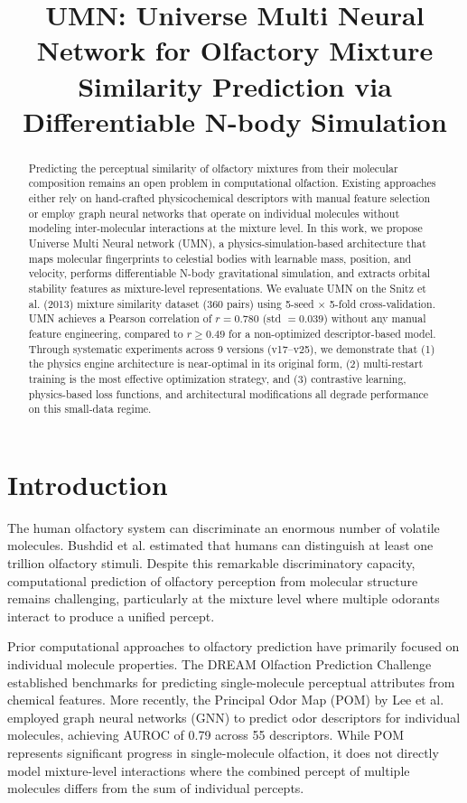 \documentclass[11pt,a4paper]{article}
\title{UMN: Universe Multi Neural Network for Olfactory Mixture Similarity Prediction via Differentiable N-body Simulation}
\author{}
\date{}
\begin{document}
\maketitle

\begin{abstract}
Predicting the perceptual similarity of olfactory mixtures from their molecular composition remains an open problem in computational olfaction. Existing approaches either rely on hand-crafted physicochemical descriptors with manual feature selection or employ graph neural networks that operate on individual molecules without modeling inter-molecular interactions at the mixture level. In this work, we propose Universe Multi Neural network (UMN), a physics-simulation-based architecture that maps molecular fingerprints to celestial bodies with learnable mass, position, and velocity, performs differentiable N-body gravitational simulation, and extracts orbital stability features as mixture-level representations. We evaluate UMN on the Snitz et al. (2013) mixture similarity dataset (360 pairs) using 5-seed $\times$ 5-fold cross-validation. UMN achieves a Pearson correlation of $r = 0.780$ (std $= 0.039$) without any manual feature engineering, compared to $r \geq 0.49$ for a non-optimized descriptor-based model. Through systematic experiments across 9 versions (v17--v25), we demonstrate that (1) the physics engine architecture is near-optimal in its original form, (2) multi-restart training is the most effective optimization strategy, and (3) contrastive learning, physics-based loss functions, and architectural modifications all degrade performance on this small-data regime.
\end{abstract}

\section{Introduction}

The human olfactory system can discriminate an enormous number of volatile molecules. Bushdid et al. \cite{bushdid2014} estimated that humans can distinguish at least one trillion olfactory stimuli. Despite this remarkable discriminatory capacity, computational prediction of olfactory perception from molecular structure remains challenging, particularly at the mixture level where multiple odorants interact to produce a unified percept.

Prior computational approaches to olfactory prediction have primarily focused on individual molecule properties. The DREAM Olfaction Prediction Challenge \cite{keller2017} established benchmarks for predicting single-molecule perceptual attributes from chemical features. More recently, the Principal Odor Map (POM) by Lee et al. \cite{lee2023} employed graph neural networks (GNN) to predict odor descriptors for individual molecules, achieving AUROC of 0.79 across 55 descriptors. While POM represents significant progress in single-molecule olfaction, it does not directly model mixture-level interactions where the combined percept of multiple molecules differs from the sum of individual percepts.
\end{document}
